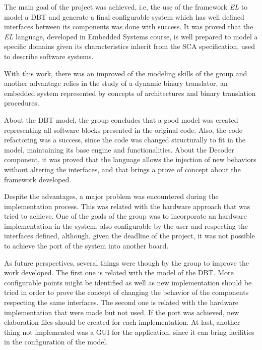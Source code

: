 \documentclass[12pt]{article}
\begin{document}
{The main goal of the project was achieved, i.e, the use of the framework \textit{EL} to model a DBT and generate a final configurable system which has well defined interfaces between its components was done with success. It was proved that the \textit{EL} language, developed in Embedded Systems course, is well prepared to model a specific domains given its characteristics inherit from the SCA specification, used to describe software systems.

With this work, there was an improved of the modeling skills of the group and another advantage relies in the study of a dynamic binary translator, an embedded system represented by concepts of architectures and binary translation procedures. 

About the DBT model, the group concludes that a good model was created representing all software blocks presented in the original code. Also, the code refactoring was a success, since the code was changed structurally to fit in the model, maintaining its base engine and functionalities. About the Decoder component, it was proved that the language allows the injection of new behaviors without altering the interfaces, and that brings a prove of concept about the framework developed.  

Despite the advantages, a major problem was encountered during the implementation process. This was related with the hardware approach that was tried to achieve. One of the goals of the group was to incorporate an hardware implementation in the system, also configurable by the user and respecting the interfaces defined, although, given the deadline of the project, it was not possible to achieve the port of the system into another board.

As future perspectives, several things were though by the group to improve the work developed. The first one is related with the model of the DBT. More configurable points might be identified as well as new implementation should be tried in order to prove the concept of changing the behavior of the components respecting the same interfaces. The second one is related with the hardware implementation that were made but not used. If the port was achieved, new elaboration files should be created for each implementation. At last, another thing not implemented was a GUI for the application, since it can bring facilities in the configuration of the model. 



\newpage



}
\end{document}
